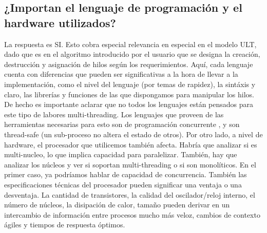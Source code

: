 \documentclass[12pt]{article}
\begin{document}
\begin{multicols}{2}
\subsection*{¿Importan el lenguaje de programación y el hardware utilizados?}
\indent La respuesta es SI. Esto cobra especial relevancia en especial en el modelo ULT, dado que es en el algoritmo introducido por el usuario que se designa la creación, destrucción y asignación de hilos según los requerimientos. Aquí, cada lenguaje cuenta con diferencias que pueden ser significativas a la hora de llevar a la implementación, como el nivel del lenguaje (por temas de rapidez), la sintáxis y claro, las librerías y funciones de las que dispongamos para manipular los hilos. De hecho es importante aclarar que no todos los lenguajes están pensados para este tipo de labores multi-threading. Los lenguajes que proveen de las herramientas necesarias para esto son de programación concurrente \cite{Res}, y son thread-safe (un sub-proceso no altera el estado de otros). Por otro lado, a nivel de hardware, el procesador que utilicemos también afecta. Habría que analizar si es multi-nucleo, lo que implica capacidad para paralelizar. También, hay que analizar los núcleos y ver si soportan multi-threading o si son monolíticos. En el primer caso, ya podríamos hablar de capacidad de concurrencia. También las especificaciones técnicas del procesador pueden significar una ventaja o una desventaja. La cantidad de transistores, la calidad del oscilador/reloj interno, el número de núcleos, la disipación de calor, tamaño pueden derivar en un intercambio de información entre procesos mucho más veloz, cambios de contexto ágiles y tiempos de respuesta óptimos. 
\end{multicols}
\end{document}
